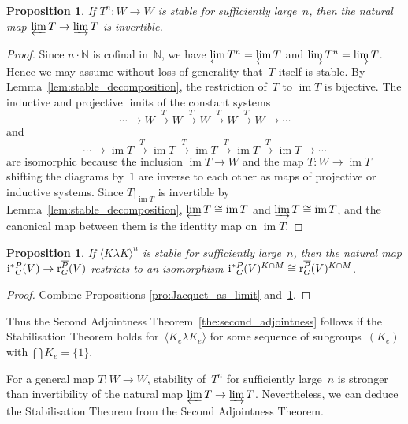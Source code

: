 \documentclass{amsart}
\newtheorem{proposition}[theorem]{Proposition}
\theoremstyle{remark}
\theoremstyle{definition}
\DeclareMathOperator{\im}{im}%
\newcommand*{\Jact}{\textup i^*{}}%
\newcommand*{\Jacr}{\textup r}%
\newcommand*{\idem}[1]{\langle#1\rangle}%
\newcommand*{\opp}[1]{\overline{#1}}%
\newcommand*{\N}{\mathbb N}%
\newcommand*{\Op}{T}%
\begin{document}
\begin{proposition}
  \label{pro:Jacquet_Stability_as_limit}
  If \(\Op^n\colon W\to W\) is stable for sufficiently large~\(n\), then the natural map \(\varprojlim \Op \to \varinjlim \Op\) is invertible.
\end{proposition}

\begin{proof}
  Since \(n\cdot\N\) is cofinal in~\(\N\), we have \(\varprojlim \Op^n = \varprojlim \Op\) and \(\varinjlim \Op^n = \varinjlim \Op\).  Hence we may assume without loss of generality that~\(\Op\) itself is stable.  By Lemma~\ref{lem:stable_decomposition}, the restriction of~\(\Op\) to \(\im \Op\) is bijective.  The inductive and projective limits of the constant systems
  \[
  \dotsb\to W \xrightarrow{\Op}
  W \xrightarrow{\Op}
  W \xrightarrow{\Op}
  W \xrightarrow{\Op}
  W \to\dotsb
  \]
  and
  \[
  \dotsb\to \im \Op \xrightarrow{\Op}
  \im \Op \xrightarrow{\Op}
  \im \Op \xrightarrow{\Op}
  \im \Op \xrightarrow{\Op}
  \im \Op \to\dotsb
  \]
  are isomorphic because the inclusion \(\im \Op\to W\) and the map \(\Op\colon W \to \im \Op\) shifting the diagrams by~\(1\) are inverse to each other as maps of projective or inductive systems.  Since \(\Op|_{\im \Op}\) is invertible by Lemma~\ref{lem:stable_decomposition}, \(\varprojlim \Op \cong \im \Op\) and \(\varinjlim \Op \cong \im \Op\), and the canonical map between them is the identity map on \(\im \Op.\)
\end{proof}

\begin{proposition}
  \label{pro:stability_to_adjointness}
  If \(\idem{K\lambda K}^n\) is stable for sufficiently large~\(n\), then the natural map \(\Jact_G^P(V)\to \Jacr_G^{\opp{P}}(V)\) restricts to an isomorphism \(\Jact_G^P(V)^{K\cap M}\cong \Jacr_G^{\opp{P}}(V)^{K\cap M}\).
\end{proposition}

\begin{proof}
  Combine Propositions \ref{pro:Jacquet_as_limit} and~\ref{pro:Jacquet_Stability_as_limit}.
\end{proof}

Thus the Second Adjointness Theorem~\ref{the:second_adjointness} follows if the Stabilisation Theorem holds for~\(\idem{K_e\lambda K_e}\) for some sequence of subgroups~\((K_e)\) with \(\bigcap K_e=\{1\}\).

For a general map \(\Op\colon W\to W\), stability of~\(\Op^n\) for sufficiently large~\(n\) is stronger than invertibility of the natural map \(\varprojlim \Op \to \varinjlim \Op\).  Nevertheless, we can deduce the Stabilisation Theorem from the Second Adjointness Theorem.
\end{document}
